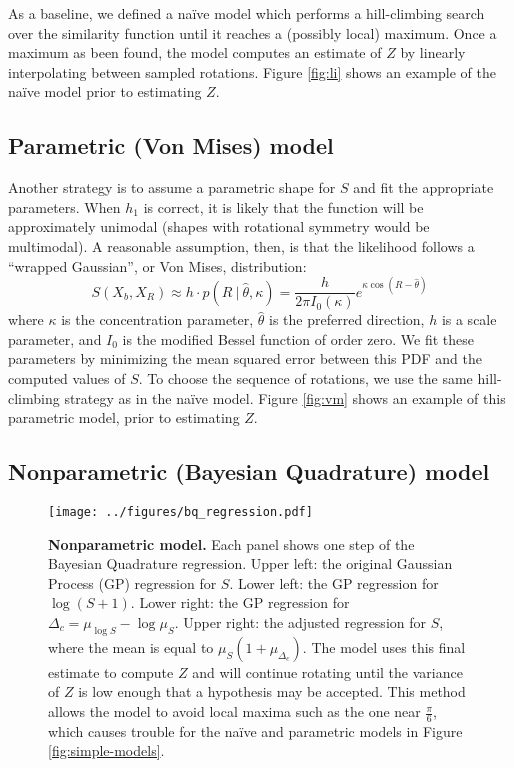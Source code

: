 \documentclass{article} %
\begin{document}
As a baseline, we defined a na\"ive model which performs a
hill-climbing search over the similarity function until it reaches a
(possibly local) maximum. Once a maximum as been found, the model
computes an estimate of $Z$ by linearly interpolating between sampled
rotations. Figure \ref{fig:li} shows an example of the na\"ive model
prior to estimating $Z$.

\subsection{Parametric (Von Mises) model}

Another strategy is to assume a parametric shape for $S$ and fit the
appropriate parameters. When $h_1$ is correct, it is likely that the
function will be approximately unimodal (shapes with rotational
symmetry would be multimodal). A reasonable assumption, then, is that
the likelihood follows a ``wrapped Gaussian'', or Von Mises,
distribution:
\begin{equation}
  S(X_b, X_R) \approx h\cdot{}p(R\ \vert\ \hat{\theta}, \kappa)=\frac{h}{2\pi I_0(\kappa)}e^{\kappa\cos(R-\hat{\theta})}
\end{equation}
where $\kappa$ is the concentration parameter, $\hat{\theta}$ is the
preferred direction, $h$ is a scale parameter, and $I_0$ is the
modified Bessel function of order zero. We fit these parameters by
minimizing the mean squared error between this PDF and the computed
values of $S$. To choose the sequence of rotations, we use the same
hill-climbing strategy as in the na\"ive model. Figure \ref{fig:vm}
shows an example of this parametric model, prior to estimating $Z$.

\subsection{Nonparametric (Bayesian Quadrature) model}

\begin{figure}[t]
  \centering
  \texttt{[image: ../figures/bq\_regression.pdf]}
  \caption{\textbf{Nonparametric model.} Each panel shows one step of
    the Bayesian Quadrature regression. Upper left: the original
    Gaussian Process (GP) regression for $S$. Lower left: the GP
    regression for $\log(S+1)$. Lower right: the GP regression for
    $\Delta_c=\mu_{\log S} - \log \mu_S$. Upper right: the adjusted
    regression for $S$, where the mean is equal to
    $\mu_S(1+\mu_{\Delta_c})$. The model uses this final estimate to
    compute $Z$ and will continue rotating until the variance of $Z$
    is low enough that a hypothesis may be accepted. This method
    allows the model to avoid local maxima such as the one near
    $\frac{\pi}{6}$, which causes trouble for the na\"ive and
    parametric models in Figure \ref{fig:simple-models}.}
  \label{fig:bq}
\end{figure}
\end{document}

